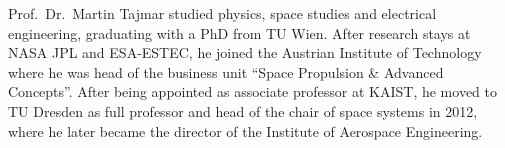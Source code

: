 \documentclass[a4paper,parskip,10pt]{scrartcl}
\begin{document}
\begin{tcolorbox}
        {
            \small
            \color{white!20!black}
            Prof.~Dr.~Martin Tajmar studied physics, space studies and electrical engineering, graduating with a PhD from TU Wien. After research stays at NASA JPL and ESA-ESTEC, he joined the Austrian Institute of Technology where he was head of the business unit ``Space Propulsion \& Advanced Concepts''. After being appointed as associate professor at KAIST, he moved to TU Dresden as full professor and head of the chair of space systems in 2012, where he later became the director of the Institute of Aerospace Engineering.}

        \vspace{2ex}
    \end{tcolorbox}

    \vfill
\end{document}
